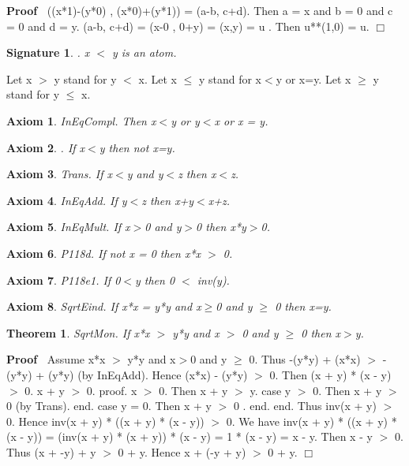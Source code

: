 \documentclass{article}
\newenvironment{forthel}{\begin{leftbar}}{\end{leftbar}}
\newenvironment{proof}{\noindent\textbf{Proof\ }}{\hspace*{\fill}$\Box$\medskip}
\newtheorem{axiom}{Axiom}
\newtheorem{theorem}{Theorem}
\newtheorem{signature}{Signature}
\begin{document}
\begin{forthel}
\begin{proof}
((x*1)-(y*0) , (x*0)+(y*1)) = (a-b, c+d).
Then a = x and b = 0 and c = 0 and d = y.
(a-b, c+d) = (x-0 , 0+y) = (x,y) = u .
Then u**(1,0) = u.
\end{proof}







\begin{signature}. x $<$ y is an atom.

\end{signature}
Let x $>$ y stand for y $<$ x.
Let x $\leq$ y stand for x$<$y or x=y.
Let x $\geq$ y stand for y $\leq$ x.

\begin{axiom} InEqCompl. Then x$<$y or y$<$x or x = y.

\end{axiom}
\begin{axiom}. If x$<$y then not x=y.

\end{axiom}

\begin{axiom} Trans. If x$<$y and y$<$z then x$<$z.

\end{axiom}


\begin{axiom} InEqAdd. If y$<$z then x+y$<$x+z.

\end{axiom}
\begin{axiom} InEqMult. If x$>$0 and y$>$0 then x*y$>$0.

\end{axiom}


\begin{axiom} P118d. If not x = 0 then x*x $>$ 0.

\end{axiom}
\begin{axiom} P118e1. If 0$<$y then 0 $<$ inv(y).

\end{axiom}

\begin{axiom} SqrtEind. If x*x = y*y and x$\geq$0 and y $\geq$ 0 then x=y.

\end{axiom}

\begin{theorem}
 SqrtMon. If x*x $>$ y*y and x $>$ 0  and y $\geq$ 0 then x$>$y.
\end{theorem}\begin{proof}
	Assume x*x $>$ y*y and x$>$0 and y $\geq$ 0.
Thus  -(y*y) + (x*x) $>$ -(y*y) + (y*y) (by InEqAdd). 
Hence (x*x) - (y*y) $>$ 0.
Then  (x + y) * (x - y) $>$ 0.
x + y $>$ 0.
proof. 	x $>$ 0. Then x + y $>$ y.
case y $>$ 0. Then x + y $>$ 0 (by Trans). end.
case y = 0. Then x + y  $>$ 0 . end.
end.
Thus inv(x + y) $>$ 0. Hence inv(x + y) * ((x + y) * (x - y)) $>$ 0.
We have inv(x + y) * ((x + y) * (x - y)) 
= (inv(x + y) * (x + y)) * (x - y)
= 1 * (x - y) = x - y.
Then x - y $>$ 0.
Thus (x + -y) + y $>$ 0 + y.
Hence x + (-y + y) $>$ 0 + y.
\end{proof}



\end{forthel}
\end{document}
